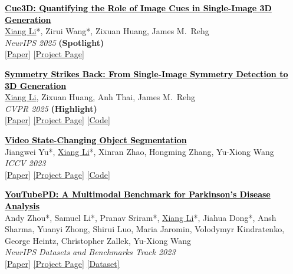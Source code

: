 \documentclass[11pt,letterpaper]{article}
\newcommand{\papertitle}[2]{\href{#1}{\textcolor{black}{\textbf{#2}}}}
\begin{document}
\begin{enumerate}[leftmargin=*, label={[\arabic*]}]
    \item \papertitle{https://ryanxli.github.io/cue3d/}{Cue3D: Quantifying the Role of Image Cues in Single-Image 3D Generation} \\
    \underline{Xiang Li}*, Zirui Wang*, Zixuan Huang, James M.\ Rehg \\
    \textit{NeurIPS 2025} \textbf{(Spotlight)} \\
    {\small \href{https://ryanxli.github.io/cue3d/static/assets/cue3d.pdf}{[Paper]} \href{https://ryanxli.github.io/cue3d/}{[Project Page]}}

    \item \papertitle{https://ryanxli.github.io/reflect3d/}{Symmetry Strikes Back: From Single-Image Symmetry Detection to 3D Generation} \\
    \underline{Xiang Li}, Zixuan Huang, Anh Thai, James M.\ Rehg \\
    \textit{CVPR 2025} \textbf{(Highlight)} \\
    {\small \href{https://ryanxli.github.io/reflect3d/static/assets/reflect3d.pdf}{[Paper]} \href{https://ryanxli.github.io/reflect3d/}{[Project Page]} \href{https://github.com/RyanXLi/SymmetryStrikesBack}{[Code]}}

    \item \papertitle{https://openaccess.thecvf.com/content/ICCV2023/papers/Yu_Video_State-Changing_Object_Segmentation_ICCV_2023_paper.pdf}{Video State-Changing Object Segmentation} \\
    Jiangwei Yu*, \underline{Xiang Li}*, Xinran Zhao, Hongming Zhang, Yu-Xiong Wang \\
    \textit{ICCV 2023} \\
    {\small \href{https://openaccess.thecvf.com/content/ICCV2023/papers/Yu_Video_State-Changing_Object_Segmentation_ICCV_2023_paper.pdf}{[Paper]} \href{https://venom12138.github.io/VSCOS.github.io/}{[Project Page]} \href{https://github.com/venom12138/vscos}{[Code]}}

    \item \papertitle{https://openreview.net/pdf?id=AIeeXKsspI}{YouTubePD: A Multimodal Benchmark for Parkinson's Disease Analysis} \\
    Andy Zhou*, Samuel Li*, Pranav Sriram*, \underline{Xiang Li}*, Jiahua Dong*, Ansh Sharma, Yuanyi Zhong, Shirui Luo, Maria Jaromin, Volodymyr Kindratenko, George Heintz, Christopher Zallek, Yu-Xiong Wang \\
    \textit{NeurIPS Datasets and Benchmarks Track 2023} \\
    {\small \href{https://openreview.net/pdf?id=AIeeXKsspI}{[Paper]} \href{https://uiuc-yuxiong-lab.github.io/YouTubePD/}{[Project Page]} \href{https://github.com/samwli/YouTubePD-data}{[Dataset]}}


\end{enumerate}
\end{document}

